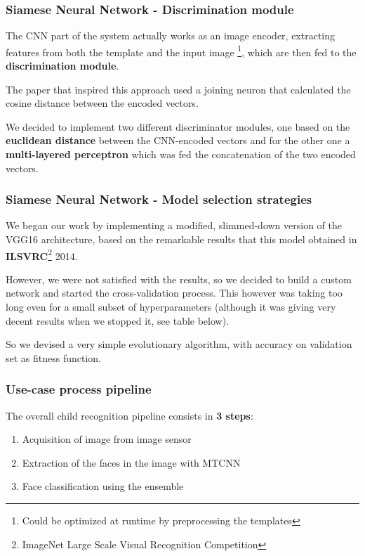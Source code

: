 \documentclass{beamer}
\begin{document}
	\begin{frame}
		\frametitle{Siamese Neural Network - Discrimination module}
		The CNN part of the system actually works as an image encoder, extracting features from both the template and the input image \footnote{Could be optimized at runtime by preprocessing the templates},
		which are then fed to the \textbf{discrimination module}.
		
		The paper that inspired this approach used a joining neuron that calculated the cosine distance between the encoded vectors.
		
		We decided to implement two different discriminator modules, one based on the \textbf{euclidean distance} between the CNN-encoded vectors and for the other one a \textbf{multi-layered perceptron} which was fed the concatenation of the two encoded vectors.
	\end{frame}	
	
	\begin{frame}
		\frametitle{Siamese Neural Network - Model selection strategies}
		We began our work by implementing a modified, slimmed-down version of the VGG16 architecture, based on the remarkable results that this model obtained in \textbf{ILSVRC}\footnote{ImageNet Large Scale Visual Recognition Competition} 2014.
	
		\bigskip
		
		However, we were not satisfied with the results, so we decided to build a custom network and started the cross-validation process. This however was taking too long even for a small subset of hyperparameters (although it was giving very decent results when we stopped it, see table below).
		
		\bigskip
		
		So we devised a very simple evolutionary algorithm, with accuracy on validation set as fitness function.
	\end{frame}
		
	
	\begin{frame}
		\frametitle{Use-case process pipeline}
		The overall child recognition pipeline consists in \textbf{3 steps}:
		\begin{enumerate}
			\item Acquisition of image from image sensor
			\item Extraction of the faces in the image with MTCNN
			\item Face classification using the ensemble
		\end{enumerate}
	\end{frame}	
	
\end{document}
